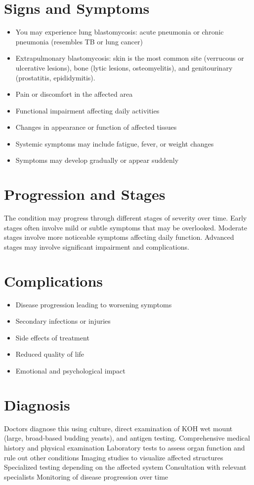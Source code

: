 \section{Signs and Symptoms}
\begin{itemize}[noitemsep]
  \item You may experience lung blastomycosis: acute pneumonia or chronic pneumonia (resembles TB or lung cancer)
  \item Extrapulmonary blastomycosis: skin is the most common site (verrucous or ulcerative lesions), bone (lytic lesions, osteomyelitis), and genitourinary (prostatitis, epididymitis).
  \item Pain or discomfort in the affected area
  \item Functional impairment affecting daily activities
  \item Changes in appearance or function of affected tissues
  \item Systemic symptoms may include fatigue, fever, or weight changes
  \item Symptoms may develop gradually or appear suddenly
\end{itemize}
\section{Progression and Stages}
The condition may progress through different stages of severity over time. Early stages often involve mild or subtle symptoms that may be overlooked. Moderate stages involve more noticeable symptoms affecting daily function. Advanced stages may involve significant impairment and complications.
\section{Complications}
\begin{itemize}[noitemsep]
  \item Disease progression leading to worsening symptoms
  \item Secondary infections or injuries
  \item Side effects of treatment
  \item Reduced quality of life
  \item Emotional and psychological impact
\end{itemize}
\section{Diagnosis}
Doctors diagnose this using culture, direct examination of KOH wet mount (large, broad-based budding yeasts), and antigen testing. Comprehensive medical history and physical examination Laboratory tests to assess organ function and rule out other conditions Imaging studies to visualize affected structures Specialized testing depending on the affected system Consultation with relevant specialists Monitoring of disease progression over time


